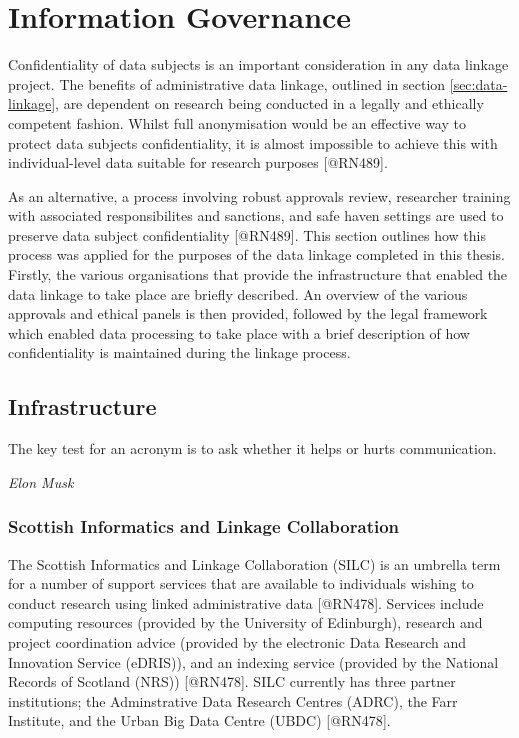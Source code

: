 \documentclass[]{article}
\begin{document}
\section{Information Governance}\label{sec:ig}

Confidentiality of data subjects is an important consideration in any
data linkage project. The benefits of administrative data linkage,
outlined in section \ref{sec:data-linkage}, are dependent on research
being conducted in a legally and ethically competent fashion. Whilst
full anonymisation would be an effective way to protect data subjects
confidentiality, it is almost impossible to achieve this with
individual-level data suitable for research purposes {[}@RN489{]}.

As an alternative, a process involving robust approvals review,
researcher training with associated responsibilites and sanctions, and
safe haven settings are used to preserve data subject confidentiality
{[}@RN489{]}. This section outlines how this process was applied for the
purposes of the data linkage completed in this thesis. Firstly, the
various organisations that provide the infrastructure that enabled the
data linkage to take place are briefly described. An overview of the
various approvals and ethical panels is then provided, followed by the
legal framework which enabled data processing to take place with a brief
description of how confidentiality is maintained during the linkage
process.

\subsection{Infrastructure}\label{subsec:infrastructure}

\epigraph{The key test for an acronym is to ask whether it helps or hurts communication.}{\textit{Elon Musk}}

\subsubsection{Scottish Informatics and Linkage Collaboration}\label{subsec:silc}

The Scottish Informatics and Linkage Collaboration (SILC) is an umbrella
term for a number of support services that are available to individuals
wishing to conduct research using linked administrative data
{[}@RN478{]}. Services include computing resources (provided by the
University of Edinburgh), research and project coordination advice
(provided by the electronic Data Research and Innovation Service
(eDRIS)), and an indexing service (provided by the National Records of
Scotland (NRS)) {[}@RN478{]}. SILC currently has three partner
institutions; the Adminstrative Data Research Centres (ADRC), the Farr
Institute, and the Urban Big Data Centre (UBDC) {[}@RN478{]}.
\end{document}
